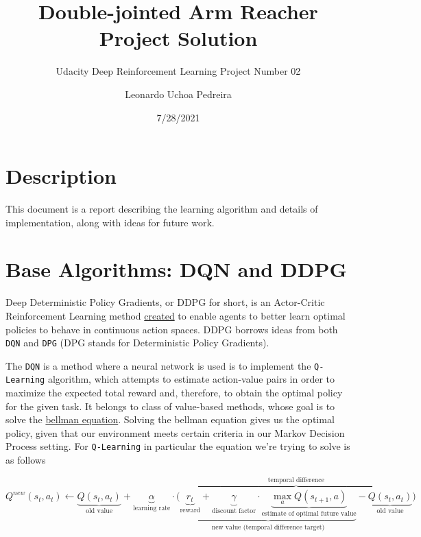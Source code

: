 \documentclass[
]{article}
\title{Double-jointed Arm Reacher Project Solution}
\subtitle{Udacity Deep Reinforcement Learning Project Number 02}
\author{Leonardo Uchoa Pedreira}
\date{7/28/2021}
\begin{document}
\maketitle

{
\setcounter{tocdepth}{2}
\tableofcontents
}
\hypertarget{description}{%
\section{Description}\label{description}}

This document is a report describing the learning algorithm and details
of implementation, along with ideas for future work.

\pagebreak

\hypertarget{base-algorithms-dqn-and-ddpg}{%
\section{Base Algorithms: DQN and
DDPG}\label{base-algorithms-dqn-and-ddpg}}

Deep Deterministic Policy Gradients, or DDPG for short, is an
Actor-Critic Reinforcement Learning method
\href{https://arxiv.org/pdf/1509.02971.pdf}{created} to enable agents to
better learn optimal policies to behave in continuous action spaces.
DDPG borrows ideas from both \texttt{DQN} and \texttt{DPG} (DPG stands
for Deterministic Policy Gradients).

The \texttt{DQN} is a method where a neural network is used is to
implement the \texttt{Q-Learning} algorithm, which attempts to estimate
action-value pairs in order to maximize the expected total reward and,
therefore, to obtain the optimal policy for the given task. It belongs
to class of value-based methods, whose goal is to solve the
\href{https://en.wikipedia.org/wiki/Bellman_equation}{bellman equation}.
Solving the bellman equation gives us the optimal policy, given that our
environment meets certain criteria in our Markov Decision Process
setting. For \texttt{Q-Learning} in particular the equation we're trying
to solve is as follows

\[
\displaystyle Q^{new}(s_{t},a_{t})\leftarrow \underbrace {Q(s_{t},a_{t})} _{\text{old value}}+\underbrace {\alpha } _{\text{learning rate}}\cdot \overbrace {{\bigg (}\underbrace {\underbrace {r_{t}} _{\text{reward}}+\underbrace {\gamma } _{\text{discount factor}}\cdot \underbrace {\max _{a}Q(s_{t+1},a)} _{\text{estimate of optimal future value}}} _{\text{new value (temporal difference target)}}-\underbrace {Q(s_{t},a_{t})} _{\text{old value}}{\bigg )}} ^{\text{temporal difference}} 
\]
\end{document}

